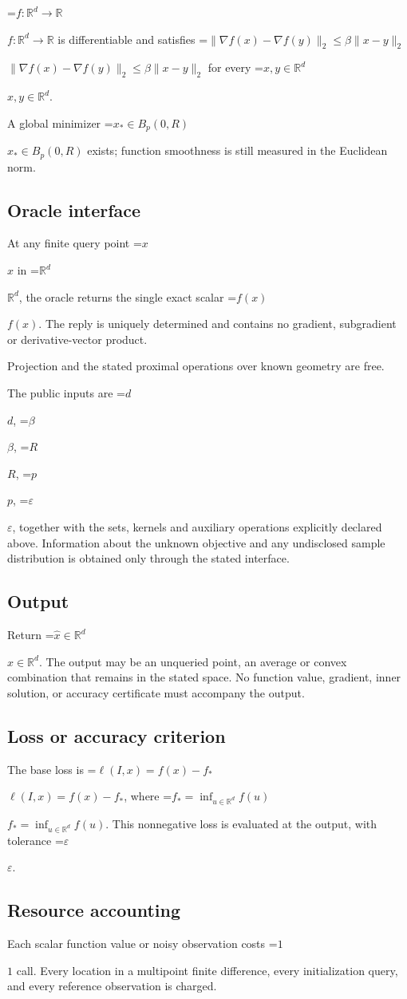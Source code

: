 \documentclass[10pt,a4paper]{article}
\newcommand{\AtlasMath}[1]{\par\begingroup\centering\setbox0=\hbox{$\displaystyle #1$}\ifdim\wd0>1.4\linewidth\typeout{ATLAS WIDE FORMULA: \the\wd0}\fi\ifdim\wd0>\linewidth\resizebox{\linewidth}{!}{\box0}\else\box0\fi\par\endgroup}
\newcommand{\AtlasInlineMath}[1]{\begingroup\setbox0=\hbox{$#1$}\ifdim\wd0>.4\linewidth\endgroup\AtlasMath{#1}\else\endgroup$#1$\fi}
\begin{document}
\AtlasInlineMath{f:\mathbb{R}^d\to\mathbb{R}} is differentiable and satisfies \AtlasInlineMath{\|\nabla f(x)-\nabla f(y)\|_2\le\beta\|x-y\|_2} for every \AtlasInlineMath{x,y\in\mathbb{R}^d}.

A global minimizer \AtlasInlineMath{x_*\in B_p(0,R)} exists; function smoothness is still measured in the Euclidean norm.

\subsection{Oracle interface}
At any finite query point \AtlasInlineMath{x} in \AtlasInlineMath{\mathbb{R}^d}, the oracle returns the single exact scalar \AtlasInlineMath{f(x)}. The reply is uniquely determined and contains no gradient, subgradient or derivative-vector product.

Projection and the stated proximal operations over known geometry are free.

The public inputs are \AtlasInlineMath{d}, \AtlasInlineMath{\beta}, \AtlasInlineMath{R}, \AtlasInlineMath{p}, \AtlasInlineMath{\varepsilon}, together with the sets, kernels and auxiliary operations explicitly declared above. Information about the unknown objective and any undisclosed sample distribution is obtained only through the stated interface.

\subsection{Output}
Return \AtlasInlineMath{\widehat{x}\in \mathbb{R}^d}. The output may be an unqueried point, an average or convex combination that remains in the stated space. No function value, gradient, inner solution, or accuracy certificate must accompany the output.

\subsection{Loss or accuracy criterion}
The base loss is \AtlasInlineMath{\ell(I,x)=f(x)-f_*}, where \AtlasInlineMath{f_*=\inf_{u\in \mathbb{R}^d}f(u)}. This nonnegative loss is evaluated at the output, with tolerance \AtlasInlineMath{\varepsilon}.

\subsection{Resource accounting}
Each scalar function value or noisy observation costs \AtlasInlineMath{1} call. Every location in a multipoint finite difference, every initialization query, and every reference observation is charged.
\end{document}

